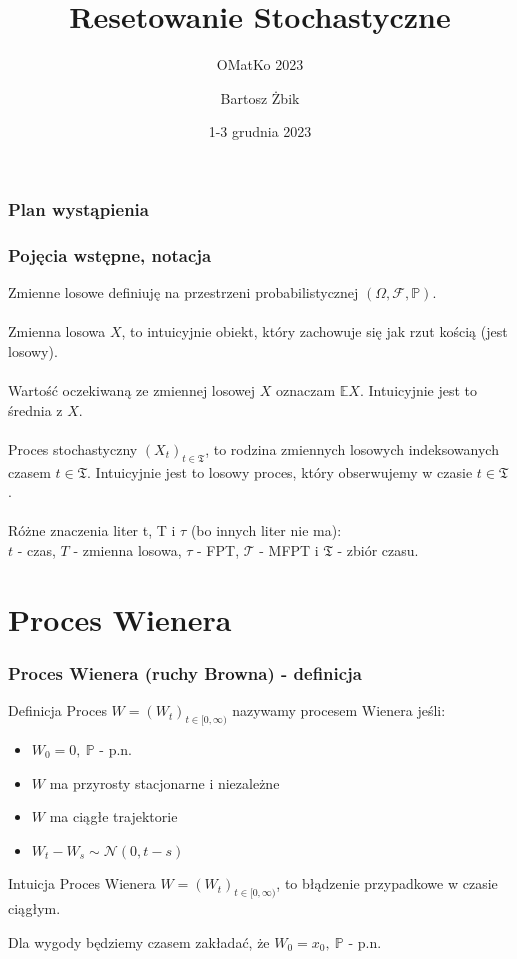 \documentclass{beamer}
\title{Resetowanie Stochastyczne}
\subtitle{OMatKo 2023}
\author{Bartosz \.Zbik}
\institute{UJ, Kraków}
\date{1-3 grudnia 2023}
\newcommand{\p}{\mathbb{P}}
\newcommand{\E}{\mathbb{E}}
\newcommand{\1}{\mathbb{1}}
\newcommand{\T}{\mathcal{T}}
\newcommand{\F}{\mathcal{F}}
\newcommand{\Time}{\mathfrak{T}}
\begin{document}
\begin{frame}
\titlepage
\end{frame}

\begin{frame}
\frametitle{Plan wystąpienia}
\tableofcontents
\end{frame}



\begin{frame}
\frametitle{Pojęcia wstępne, notacja}
Zmienne losowe definiuję na przestrzeni probabilistycznej $(\Omega, \F, \p)$. \\~\\
\pause
Zmienna losowa $X$, to intuicyjnie obiekt, który zachowuje się jak rzut kością (jest losowy).\\~\\
\pause
Wartość oczekiwaną ze zmiennej losowej $X$ oznaczam $\E X$. Intuicyjnie jest to średnia z $X$.\\~\\
\pause
Proces stochastyczny $(X_t)_{t \in \Time}$, to rodzina zmiennych losowych indeksowanych czasem $t \in \Time$.
Intuicyjnie jest to losowy proces, który obserwujemy w czasie $t \in \Time$. \\~\\
\pause
Różne znaczenia liter t, T i $\tau$ (bo innych liter nie ma): \\
 $t$ - czas, $T$ - zmienna losowa, $\tau$ - FPT, $\T$ - MFPT i $\Time$ - zbiór czasu.

\end{frame}

\section{Proces Wienera}
\begin{frame}
\frametitle{Proces Wienera (ruchy Browna) - definicja}
\begin{block}{Definicja}
Proces $W = (W_t)_{t \in [0, \infty)}$ nazywamy procesem Wienera jeśli:
\begin{itemize}
\item $W_0 = 0, ~\p$ - p.n.
\item $W$ ma przyrosty stacjonarne i niezależne
\item $W$ ma ciągłe trajektorie
\item $W_t - W_s \sim \mathcal{N}(0, t-s)$
\end{itemize}
\end{block}
\begin{block}{Intuicja}
Proces Wienera $W = (W_t)_{t \in [0, \infty)}$, to błądzenie przypadkowe w czasie ciągłym.
\end{block}

Dla wygody będziemy czasem zakładać, że $W_0 = x_0, ~\p$ - p.n.
\end{frame}
\end{document}
